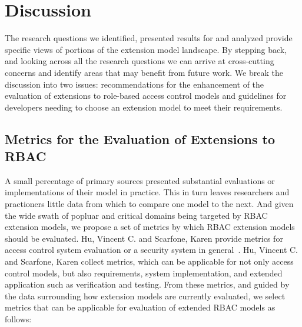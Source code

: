 \section{Discussion} \label{sec:discussion}

The research questions we identified, presented results for and analyzed provide specific views of portions of the extension model landscape. 
By stepping back, and looking across all the research questions we can arrive at cross-cutting concerns and identify areas that may benefit from future work.
We break the discussion into two issues: recommendations for the enhancement of the evaluation of extensions to role-based access control models and guidelines for developers needing to choose an extension model to meet their requirements.

\subsection{Metrics for the Evaluation of Extensions to RBAC}

A small percentage of primary sources presented substantial evaluations or implementations of their model in practice.  This in turn leaves researchers and practioners little data from which to compare one model to the next. And given the wide swath of popluar and critical domains being targeted by RBAC extension models, we propose a set of metrics by which RBAC extension models should be evaluated. Hu, Vincent C. and Scarfone, Karen provide metrics for access control system evaluation or a security system in general~\cite{hu2012:NIST7874}. Hu, Vincent C. and Scarfone, Karen collect metrics, which can be applicable for not only access control models, but also requirements, system implementation, and extended application such as verification and testing. From these metrics, and guided by the data surrounding how extension models are currently evaluated, we select metrics that can be applicable for evaluation of extended RBAC models as follows:

